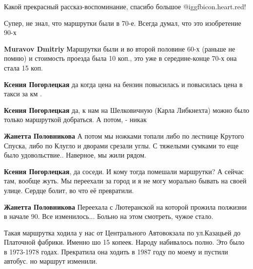  
 
 
 
 
\zzSecCmt

\begin{itemize} %

Какой прекрасный рассказ-воспоминание, спасибо большое @igg{fbicon.heart.red}!

Супер, не знал, что маршрутки были в 70-е. Всегда думал, что это изобретение 90-х

\begin{itemize} %
\textbf{Muravov Dmitriy} Маршрутки были и во второй половине 60-х (раньше не помню) и стоимость проезда была 10 коп., это уже в середине-конце 70-х она стала 15 коп.

\textbf{Ксения Погорлецкая} да когда цена на бензин повысилась и повысилась цена в такси за км .

\textbf{Ксения Погорлецкая} да, к нам на Шелковичную (Карла Либкнехта) можно было только маршруткой добраться. А потом, - никак

\textbf{Жанетта Половникова} А потом мы ножками топали либо по лестнице Крутого Спуска, либо по Клугло и дворами срезали углы. С тяжелыми сумками то еще было удовольствие.. Наверное, мы жили рядом.

\textbf{Ксения Погорлецкая}, да соседи. И кому тогда помешали маршрутки? А сейчас там, вообще жуть. Мы переехали за город и я не могу морально бывать на своей улице. Сердце болит, во что её превратили.

\textbf{Жанетта Половникова} Переехала с Лютеранской на которой прожила полжизни в начале 90. Все изменилось... Больно на этом смотреть, чужое стало.
\end{itemize} %


Такая маршрутка ходила у нас от Центрального Автовокзала по ул.Казацьей до
Платочной фабрики. Именно шо 15 копеек. Народу набивалось полно. Это было в
1973-1978 годах. Прекратила она ходить в 1987 году по моему и пустили автобус.
но маршрут изменили.


\end{itemize}
